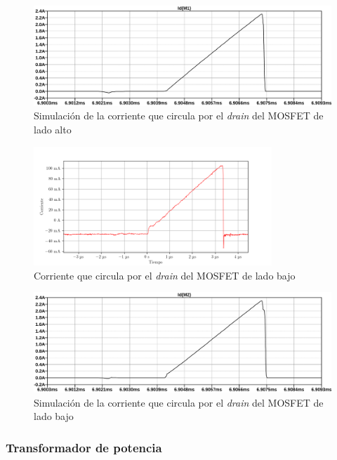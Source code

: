 \begin{figure}[H]
    \centering
    \includegraphics[width=\textwidth]{images/sim/10.pdf}
    \caption{Simulación de la corriente que circula por el \textit{drain} del MOSFET de lado alto}
    \label{fig:sim:10}
\end{figure}

\begin{figure}[H]
    \centering
    \includegraphics[width=0.8\textwidth]{images/capturas-osciloscopio/17-11-2022/22.png}
    \caption{Corriente que circula por el \textit{drain} del MOSFET de lado bajo}
    \label{fig:osc:22}
\end{figure}

\begin{figure}[H]
    \centering
    \includegraphics[width=\textwidth]{images/sim/11.pdf}
    \caption{Simulación de la corriente que circula por el \textit{drain} del MOSFET de lado bajo}
    \label{fig:sim:11}
\end{figure}

\subsubsection{Transformador de potencia}

